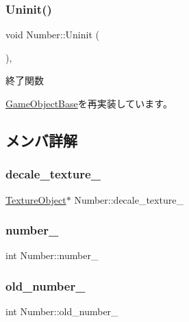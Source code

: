 \subsubsection{\texorpdfstring{Uninit()}{Uninit()}}
{\footnotesize\ttfamily void Number\+::\+Uninit (\begin{DoxyParamCaption}{ }\end{DoxyParamCaption})\hspace{0.3cm}{\ttfamily [override]}, {\ttfamily [virtual]}}



終了関数 



\mbox{\hyperlink{class_game_object_base_a97e1bc277d7b1c0156d4735de29a022c}{Game\+Object\+Base}}を再実装しています。



\subsection{メンバ詳解}
\mbox{\label{class_number_a305385aaec293089117c50fd1cf2575f}} 
\subsubsection{\texorpdfstring{decale\+\_\+texture\+\_\+}{decale\_texture\_}}
{\footnotesize\ttfamily \mbox{\hyperlink{class_texture_object}{Texture\+Object}}$\ast$ Number\+::decale\+\_\+texture\+\_\+}

\mbox{\label{class_number_a8c3235a3442303d4ef950fef5eb7b34c}} 
\subsubsection{\texorpdfstring{number\+\_\+}{number\_}}
{\footnotesize\ttfamily int Number\+::number\+\_\+}

\mbox{\label{class_number_acd5422010e99cbf61196094a9b501115}} 
\subsubsection{\texorpdfstring{old\+\_\+number\+\_\+}{old\_number\_}}
{\footnotesize\ttfamily int Number\+::old\+\_\+number\+\_\+}

